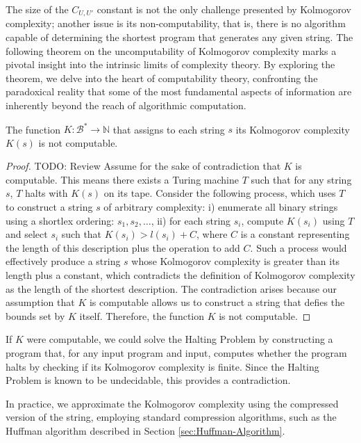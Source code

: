 The size of the \(C_{U, U'}\) constant is not the only challenge presented by Kolmogorov complexity; another issue is its non-computability, that is, there is no algorithm capable of determining the shortest program that generates any given string. The following theorem on the uncomputability of Kolmogorov complexity marks a pivotal insight into the intrinsic limits of complexity theory. By exploring the theorem, we delve into the heart of computability theory, confronting the paradoxical reality that some of the most fundamental aspects of information are inherently beyond the reach of algorithmic computation.

\begin{theorem}
The function \(K: \mathcal{B}^\ast \rightarrow \mathbb{N}\) that assigns to each string \(s\) its Kolmogorov complexity \(K(s)\) is not computable.
\end{theorem}
\begin{proof}
{\color{red} TODO: Review}
Assume for the sake of contradiction that \(K\) is computable. This means there exists a Turing machine \(T\) such that for any string \(s\), \(T\) halts with \(K(s)\) on its tape. Consider the following process, which uses \(T\) to construct a string \(s\) of arbitrary complexity: i) enumerate all binary strings using a shortlex ordering: \(s_1, s_2, \ldots\), ii) for each string \(s_i\), compute \(K(s_i)\) using \(T\) and select \(s_i\) such that \(K(s_i) > l(s_i) + C\), where \(C\) is a constant representing the length of this description plus the operation to add \(C\). Such a process would effectively produce a string \(s\) whose Kolmogorov complexity is greater than its length plus a constant, which contradicts the definition of Kolmogorov complexity as the length of the shortest description. The contradiction arises because our assumption that \(K\) is computable allows us to construct a string that defies the bounds set by \(K\) itself. Therefore, the function \(K\) is not computable.
\end{proof}

If \(K\) were computable, we could solve the Halting Problem by constructing a program that, for any input program and input, computes whether the program halts by checking if its Kolmogorov complexity is finite. Since the Halting Problem is known to be undecidable, this provides a contradiction.

In practice, we approximate the Kolmogorov complexity using the compressed version of the string, employing standard compression algorithms, such as the Huffman algorithm described in Section \ref{sec:Huffman-Algorithm}.

